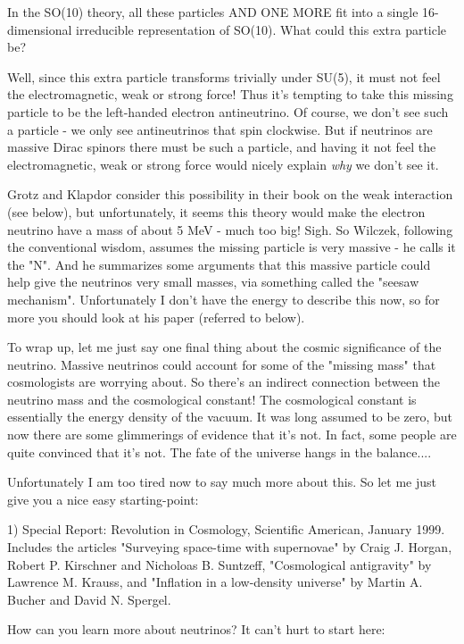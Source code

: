 In the SO(10) theory, all these particles AND ONE MORE fit into a single 
16-dimensional irreducible representation of SO(10).  What could this 
extra particle be?  

Well, since this extra particle transforms trivially under SU(5), it
must not feel the electromagnetic, weak or strong force!  Thus it's
tempting to take this missing particle to be the left-handed electron 
antineutrino.  Of course, we don't see such a particle - we only see
antineutrinos that spin clockwise.  But if neutrinos are massive Dirac 
spinors there must be such a particle, and having it not feel the
electromagnetic, weak or strong force would nicely explain \emph{why} we
don't see it.


Grotz and Klapdor consider this possibility in their book on the weak
interaction (see below), but unfortunately, it seems this theory would
make the electron neutrino have a mass of about 5 MeV - much too big!
Sigh.  So Wilczek, following the conventional wisdom, assumes the
missing particle is very massive - he calls it the "N".  And
he summarizes some arguments that this massive particle could help give
the neutrinos very small masses, via something called the "seesaw
mechanism".  Unfortunately I don't have the energy to describe this
now, so for more you should look at his paper (referred to below).

To wrap up, let me just say one final thing about the cosmic
significance of the neutrino.  Massive neutrinos could account for some
of the "missing mass" that cosmologists are worrying about.
So there's an indirect connection between the neutrino mass and the
cosmological constant!  The cosmological constant is essentially the
energy density of the vacuum.  It was long assumed to be zero, but now
there are some glimmerings of evidence that it's not.  In fact, some
people are quite convinced that it's not.  The fate of the universe
hangs in the balance....

Unfortunately I am too tired now to say much more about this.
So let me just give you a nice easy starting-point:

1) Special Report: Revolution in Cosmology, Scientific American, January
1999.  Includes the articles "Surveying space-time with
supernovae" by Craig J. Horgan, Robert P. Kirschner and
Nicholoas B.  Suntzeff, "Cosmological antigravity" by
Lawrence M. Krauss, and "Inflation in a low-density
universe" by Martin A. Bucher and David N.  Spergel.

How can you learn more about neutrinos?  It can't hurt to start here:

